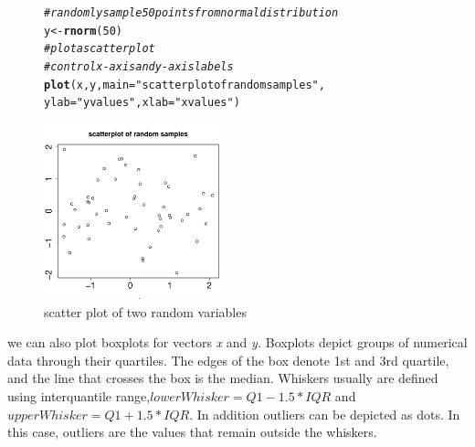 \documentclass[english,nohyper]{tufte-book}\usepackage[]{graphicx}\usepackage[]{color}
\makeatletter
\newcommand{\hlnum}[1]{\textcolor[rgb]{0.686,0.059,0.569}{#1}}%
\newcommand{\hlstr}[1]{\textcolor[rgb]{0.192,0.494,0.8}{#1}}%
\newcommand{\hlcom}[1]{\textcolor[rgb]{0.678,0.584,0.686}{\textit{#1}}}%
\newcommand{\hlstd}[1]{\textcolor[rgb]{0.345,0.345,0.345}{#1}}%
\newcommand{\hlkwb}[1]{\textcolor[rgb]{0.69,0.353,0.396}{#1}}%
\newcommand{\hlkwc}[1]{\textcolor[rgb]{0.333,0.667,0.333}{#1}}%
\newcommand{\hlkwd}[1]{\textcolor[rgb]{0.737,0.353,0.396}{\textbf{#1}}}%
\newenvironment{kframe}{%
 \def\at@end@of@kframe{}%
 \ifinner\ifhmode%
  \def\at@end@of@kframe{\end{minipage}}%
  \begin{minipage}{\columnwidth}%
 \fi\fi%
 \def\FrameCommand##1{\hskip\@totalleftmargin \hskip-\fboxsep
 \colorbox{shadecolor}{##1}\hskip-\fboxsep
     \hskip-\linewidth \hskip-\@totalleftmargin \hskip\columnwidth}%
 \MakeFramed {\advance\hsize-\width
   \@totalleftmargin\z@ \linewidth\hsize
   \@setminipage}}%
 {\par\unskip\endMakeFramed%
 \at@end@of@kframe}
\newenvironment{knitrout}{}{} %
\makeatother
\begin{document}
\begin{figure}
\begin{knitrout}
\color{fgcolor}\begin{kframe}
\begin{alltt}
\hlcom{# randomly sample 50 points from normal distribution }
\hlstd{y}\hlkwb{<-}\hlkwd{rnorm}\hlstd{(}\hlnum{50}\hlstd{)}
\hlcom{#plot a scatter plot }
\hlcom{# control x-axis and y-axis labels}
\hlkwd{plot}\hlstd{(x,y,}\hlkwc{main}\hlstd{=}\hlstr{"scatterplot of random samples"}\hlstd{,}
        \hlkwc{ylab}\hlstd{=}\hlstr{"y values"}\hlstd{,}\hlkwc{xlab}\hlstd{=}\hlstr{"x values"}\hlstd{)}
\end{alltt}
\end{kframe}

{\centering \includegraphics[width=2in,height=2in]{figure/graphics-scatter} 

}



\end{knitrout}


\caption{scatter plot of two random variables\label{fig:scatter-plot-of}}
\end{figure}


we can also plot boxplots for vectors \emph{x} and \emph{y.} Boxplots
depict groups of numerical data through their quartiles. The edges
of the box denote 1st and 3rd quartile, and the line that crosses
the box is the median. Whiskers usually are defined using interquantile
range,$lowerWhisker=Q1-1.5*IQR$ and $upperWhisker=Q1+1.5*IQR$. In
addition outliers can be depicted as dots. In this case, outliers
are the values that remain outside the whiskers.
\end{document}
